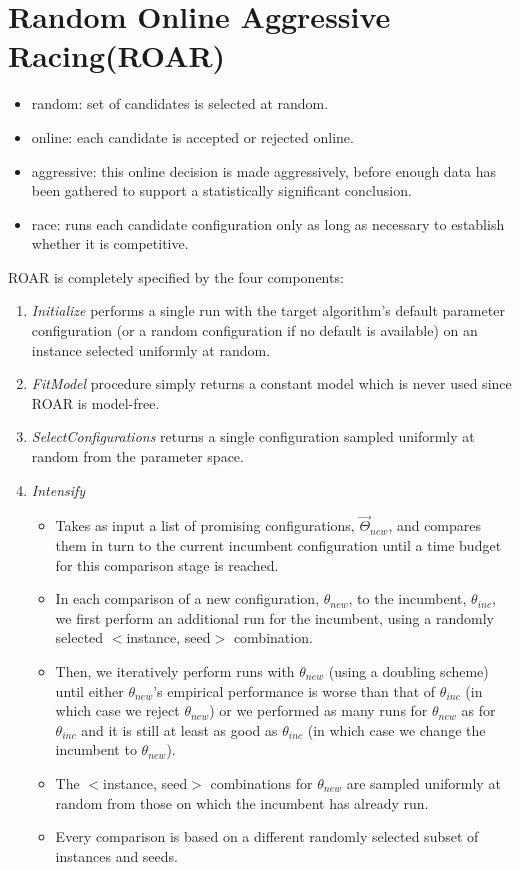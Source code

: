 \documentclass[10pt]{article}
\theoremstyle{definition}
\begin{document}
\section{Random Online Aggressive Racing(ROAR)}
\label{sec:ROAR}
\begin{itemize}
	\item random: set of candidates is selected at random.
	\item online: each candidate is accepted or rejected online.
	\item aggressive: this online decision is made aggressively,
	      before enough data has been gathered to support a statistically significant conclusion.
	\item race: runs each candidate configuration only as long as necessary to
	      establish whether it is competitive.
\end{itemize}

ROAR is completely specified by the four components:
\begin{enumerate}
	\item {\it Initialize} performs a single run with the target algorithm’s default parameter configuration
	      (or a random configuration if no default is available) on an instance selected uniformly at random.
	\item {\it FitModel} procedure simply returns a constant model which is never used since ROAR is model-free.
	\item {\it SelectConfigurations} returns a single configuration sampled uniformly at random from the parameter space.
	\item {\it Intensify} \begin{itemize}
		      \item Takes as input a list of promising configurations, $\vec{\Theta}_{new}$, and compares them in turn to the current
		            incumbent configuration until a time budget for this comparison stage is reached.
		      \item  In each comparison of a new configuration, $\theta_{new}$, to the incumbent, $\theta_{inc}$, we first
		            perform an additional run for the incumbent, using a randomly selected $<$instance, seed$>$ combination.
		      \item Then, we iteratively perform runs with $\theta_{new}$ (using a doubling scheme)
		            until either $\theta_{new}$’s empirical performance is worse than that of $\theta_{inc}$ (in which case
		            we reject $\theta_{new}$) or we performed as many runs for $\theta_{new}$ as for $\theta_{inc}$ and it is still at
		            least as good as $\theta_{inc}$ (in which case we change the incumbent to $\theta_{new}$).
		      \item The $<$instance, seed$>$ combinations for $\theta_{new}$ are sampled uniformly at random from those on which
		            the incumbent has already run.
		      \item Every comparison is based on a different randomly selected subset of instances and seeds.
	      \end{itemize}
\end{enumerate}
\end{document}
